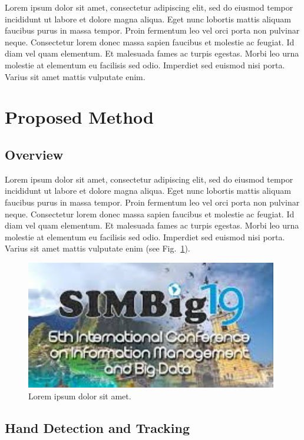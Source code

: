 \documentclass[runningheads]{llncs}
\begin{document}
Lorem ipsum dolor sit amet, consectetur adipiscing elit, sed do eiusmod tempor incididunt ut labore et dolore magna aliqua. Eget nunc lobortis mattis aliquam faucibus purus in massa tempor. Proin fermentum leo vel orci porta non pulvinar neque. Consectetur lorem donec massa sapien faucibus et molestie ac feugiat. Id diam vel quam elementum. Et malesuada fames ac turpis egestas. Morbi leo urna molestie at elementum eu facilisis sed odio. Imperdiet sed euismod nisi porta. Varius sit amet mattis vulputate enim.




\section{Proposed Method}

\subsection{Overview}

Lorem ipsum dolor sit amet, consectetur adipiscing elit, sed do eiusmod tempor incididunt ut labore et dolore magna aliqua. Eget nunc lobortis mattis aliquam faucibus purus in massa tempor. Proin fermentum leo vel orci porta non pulvinar neque. Consectetur lorem donec massa sapien faucibus et molestie ac feugiat. Id diam vel quam elementum. Et malesuada fames ac turpis egestas. Morbi leo urna molestie at elementum eu facilisis sed odio. Imperdiet sed euismod nisi porta. Varius sit amet mattis vulputate enim (see Fig.~\ref{figure1}).

\begin{figure}[!htbp]
\centerline{\includegraphics[width=110mm]{images/image-example.jpeg}}
\caption{Lorem ipsum dolor sit amet.} \label{figure1}
\end{figure}


\subsection{Hand Detection and Tracking}
\end{document}
